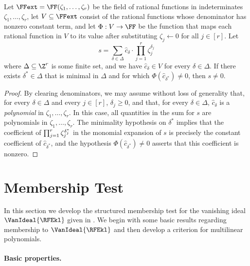 \begin{proposition} \label{prop.multi-zsub-deriv.helper}
  Let \(\FFext = \FF(\zeta_1,\ldots,\zeta_r)\) be the field of rational
  functions in indeterminates \(\zeta_1, \ldots, \zeta_r\),
  let \(V \subseteq \FFext\) consist of the rational functions whose
  denominator has nonzero constant term,
  and let \(\Phi : V \to \FF\) be the function that maps each rational
  function in \(V\) to its value after substituting \(\zeta_j \gets 0\)
  for all \(j \in [r]\).
  Let
  \[
    s = \sum_{\delta\in \Delta} \hat{c}_\delta \cdot \prod_{j=1}^r \zeta_j^{\delta_j}
  \]
  where \(\Delta \subseteq \Z^r\) is some finite set,
  and
  we have \(\hat{c}_\delta \in V\)
  for every \(\delta \in \Delta\).
  If there exists \(\delta^* \in \Delta\)
  that is minimal in $\Delta$
  and
  for which \(\Phi(\hat{c}_{\delta^*}) \ne 0\),
  then $s \ne 0$.
\end{proposition}
\begin{proof}
  By clearing denominators,
  we may assume without loss of generality
  that,
    for every \(\delta \in \Delta\) and every $j \in [r]$,
    \(\delta_j \ge 0\),
  and that,
    for every \(\delta \in \Delta\),
    \(\hat{c}_\delta\) is a \emph{polynomial} in \(\zeta_1, \ldots, \zeta_r\).
  In this case, all quantities in the sum for \(s\) are polynomials in
  \(\zeta_1,\ldots,\zeta_r\).
  The minimality hypothesis on \(\delta^*\) implies that
  the coefficient of \(\prod_{j=1}^r \zeta_j^{\smash{\delta^*_j}}\) in the monomial
  expansion of \(s\) is precisely the constant coefficient of
  \(\hat{c}_{\delta^*}\),
  and the hypothesis \(\Phi(\hat{c}_{\delta^*}) \ne 0\) asserts that this
  coefficient is nonzero.
\end{proof}



\section{Membership Test}
\label{s.test}

In this section we develop the structured membership test for the vanishing ideal $\VanIdeal{\RFEkl}$ given in .
We begin with some basic results regarding membership to $\VanIdeal{\RFEkl}$ and then develop a criterion for multilinear polynomials.

\paragraph{Basic properties.}

